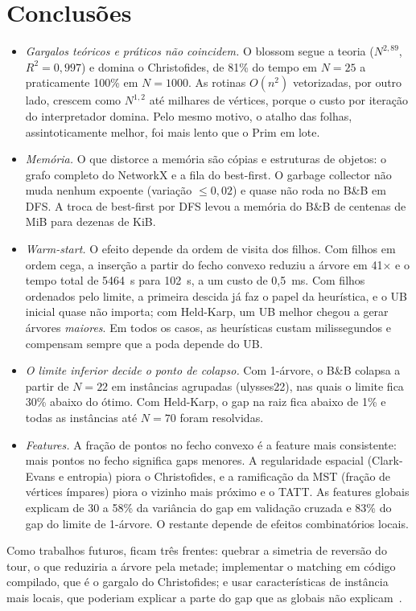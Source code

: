 \section{Conclusões}

\begin{itemize}
  \item \emph{Gargalos teóricos e práticos não coincidem.} O blossom segue
    a teoria ($N^{2{,}89}$, $R^2=0{,}997$) e domina o Christofides, de 81\%
    do tempo em $N=25$ a praticamente 100\% em $N=1000$. As rotinas
    $O(n^2)$ vetorizadas, por outro lado, crescem como $N^{1{,}2}$ até
    milhares de vértices, porque o custo por iteração do interpretador
    domina. Pelo mesmo motivo, o atalho das folhas, assintoticamente
    melhor, foi mais lento que o Prim em lote.
  \item \emph{Memória.} O que distorce a memória são cópias e estruturas
    de objetos: o grafo completo do NetworkX e a fila do best-first. O
    garbage collector não muda nenhum expoente (variação $\le0{,}02$) e
    quase não roda no B\&B em DFS. A troca de best-first por DFS levou a
    memória do B\&B de centenas de MiB para dezenas de KiB.
  \item \emph{Warm-start.} O efeito depende da ordem de visita dos filhos.
    Com filhos em ordem cega, a inserção a partir do fecho convexo reduziu
    a árvore em 41$\times$ e o tempo total de 5464~s para 102~s, a um custo
    de 0,5~ms. Com filhos ordenados pelo limite, a primeira descida já faz
    o papel da heurística, e o UB inicial quase não importa; com
    Held-Karp, um UB melhor chegou a gerar árvores \emph{maiores}. Em todos
    os casos, as heurísticas custam milissegundos e compensam sempre que a
    poda depende do UB.
  \item \emph{O limite inferior decide o ponto de colapso.} Com 1-árvore, o
    B\&B colapsa a partir de $N=22$ em instâncias agrupadas (ulysses22),
    nas quais o limite fica 30\% abaixo do ótimo. Com Held-Karp, o gap na
    raiz fica abaixo de 1\% e todas as instâncias até $N=70$ foram
    resolvidas.
  \item \emph{Features.} A fração de pontos no fecho convexo é a feature
    mais consistente: mais pontos no fecho significa gaps menores. A
    regularidade espacial (Clark-Evans e entropia) piora o Christofides, e
    a ramificação da MST (fração de vértices ímpares) piora o vizinho mais
    próximo e o TATT. As features globais explicam de 30 a 58\% da
    variância do gap em validação cruzada e 83\% do gap do limite de
    1-árvore. O restante depende de efeitos combinatórios locais.
\end{itemize}

Como trabalhos futuros, ficam três frentes: quebrar a simetria de reversão
do tour, o que reduziria a árvore pela metade; implementar o matching em
código compilado, que é o gargalo do Christofides; e usar características
de instância mais locais, que poderiam explicar a parte do gap que as
globais não explicam~\cite{smithmiles2012}.
